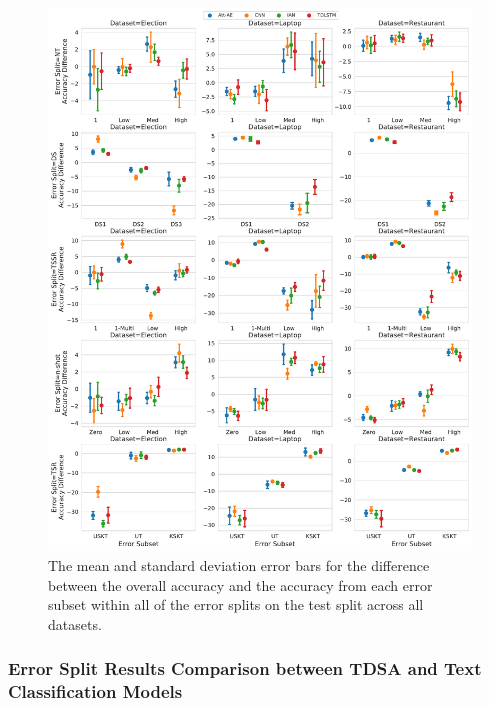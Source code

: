 \begin{figure}[h!]
    \centering
    \includegraphics[scale=0.45]{images/augmentation/methods_performance/baseline/test_error_diff_subsets.pdf}
    \caption{The mean and standard deviation error bars for the difference between the overall accuracy and the accuracy from each error subset within all of the error splits on the test split across all datasets.}
    \label{fig:aug_baseline_test_error_diff_subset}
\end{figure}

\FloatBarrier
\subsubsection{Error Split Results Comparison between TDSA and Text Classification Models}

